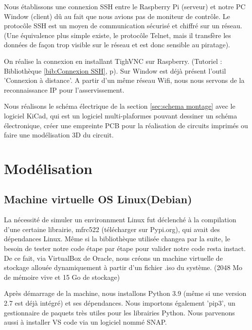 \documentclass[a4paper]{report}
\begin{document}
    Nous établissons une connexion SSH entre le Raspberry Pi (serveur) et notre PC Window (client) dû au fait
    que nous avions pas de moniteur de contr\^{o}le. Le protoc\^{o}le SSH est un moyen 
    de communication sécurisé et chiffré sur un réseau. (Une équivalence plus simple
    existe, le protoc\^{o}le Telnet, mais il transfère les données de façon trop visible
    sur le réseau et est donc sensible au piratage). 

    On réalise la connexion en installant TighVNC sur Raspberry. (Tutoriel : Bibliothèque \ref{bib:Connexion SSH},
    p\pageref{bib:Connexion SSH}). Sur Window est déjà présent l'outil 'Connexion à distance'.
    A partir d'un m\^{e}me réseau Wifi,  nous nous servons de la reconnaissance IP pour l'asservissement.

    Nous réalisons le schéma électrique de la section \ref{sec:schema montage} avec le logiciel KiCad,
    qui est un logiciel multi-plaformes pouvant dessiner un schéma électronique, créer une empreinte
    PCB pour la réalisation de circuits imprimés ou faire une modélisation 3D du circuit.
    
    

    \chapter{Modélisation}
    
        \section{Machine virtuelle OS Linux(Debian)}
        
        La nécessité de simuler un environnment Linux fut déclenché à la compilation d'une
    certaine librairie, mfrc522 (télécharger sur Pypi.org), qui avait des dépendances Linux.
    M\^{e}me si la bibliothèque utilisée changea par la suite, le besoin de tester notre code
    étape par étape pour valider notre code resta instact.
    De ce fait, via VirtualBox de Oracle, nous créons un machine virtuelle de stockage allouée 
    dynamiquement à partir d'un fichier .iso du système. (2048 Mo de mémoire vive et 15 Go de stockage)

    Après démarrage de la machine, nous installons Python 3.9 (m\^{e}me si une version 2.7 est
    déjà intégré) et ses dépendances. Nous importons également 'pip3', un gestionnaire de paquets
    très utiles pour les librairies Python. Nous parvenons aussi à installer VS code via un 
    logiciel nommé SNAP.
\end{document}
